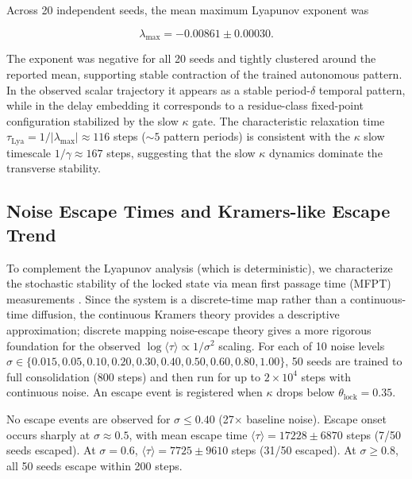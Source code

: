 \documentclass[12pt,a4paper]{article}
\begin{document}
Across 20 independent seeds, the mean maximum Lyapunov exponent was

\[

\lambda_{\max} = -0.00861 \pm 0.00030.

\]

The exponent was negative for all 20 seeds and tightly clustered around the reported mean, supporting stable contraction of the trained autonomous pattern. In the observed scalar trajectory it appears as a stable period-$\delta$ temporal pattern, while in the delay embedding it corresponds to a residue-class fixed-point configuration stabilized by the slow $\kappa$ gate. The characteristic relaxation time $\tau_{\mathrm{Lya}} = 1/|\lambda_{\max}| \approx 116$ steps ($\sim 5$ pattern periods) is consistent with the $\kappa$ slow timescale $1/\gamma \approx 167$ steps, suggesting that the slow $\kappa$ dynamics dominate the transverse stability.



\subsection{Noise Escape Times and Kramers-like Escape Trend}

\label{sec:kramers}



To complement the Lyapunov analysis (which is deterministic), we characterize the stochastic stability of the locked state via mean first passage time (MFPT) measurements \cite{kramers1940brownian, hanggi1990reaction}. Since the system is a discrete-time map rather than a continuous-time diffusion, the continuous Kramers theory provides a descriptive approximation; discrete mapping noise-escape theory \cite{berglund2002metastability} gives a more rigorous foundation for the observed $\log\langle\tau\rangle \propto 1/\sigma^2$ scaling. For each of 10 noise levels $\sigma \in \{0.015, 0.05, 0.10, 0.20, 0.30, 0.40, 0.50, 0.60, 0.80, 1.00\}$, 50 seeds are trained to full consolidation (800 steps) and then run for up to $2 \times 10^4$ steps with continuous noise. An escape event is registered when $\kappa$ drops below $\theta_{\mathrm{lock}} = 0.35$.



No escape events are observed for $\sigma \leq 0.40$ (27$\times$ baseline noise). Escape onset occurs sharply at $\sigma \approx 0.5$, with mean escape time $\langle\tau\rangle = 17228 \pm 6870$ steps (7/50 seeds escaped). At $\sigma = 0.6$, $\langle\tau\rangle = 7725 \pm 9610$ steps (31/50 escaped). At $\sigma \geq 0.8$, all 50 seeds escape within 200 steps.
\end{document}
